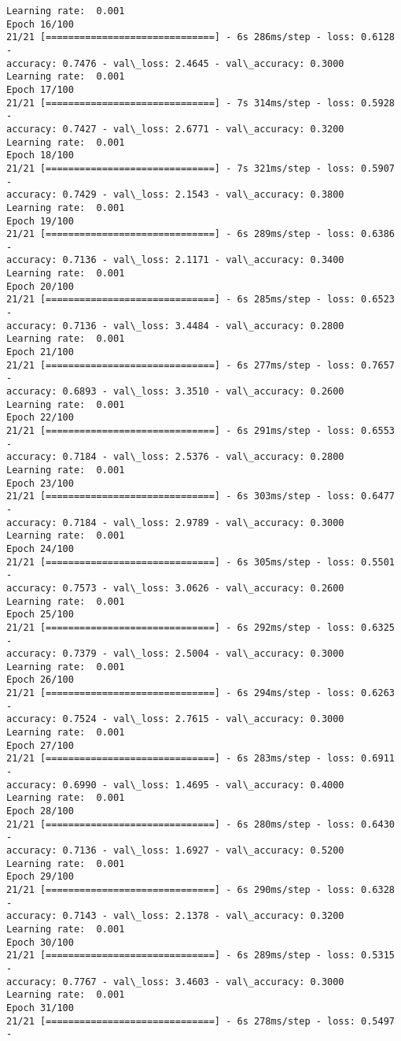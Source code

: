 \documentclass[11pt]{article}
\begin{document}
\begin{Verbatim}[commandchars=\\\{\}]
Learning rate:  0.001
Epoch 16/100
21/21 [==============================] - 6s 286ms/step - loss: 0.6128 -
accuracy: 0.7476 - val\_loss: 2.4645 - val\_accuracy: 0.3000
Learning rate:  0.001
Epoch 17/100
21/21 [==============================] - 7s 314ms/step - loss: 0.5928 -
accuracy: 0.7427 - val\_loss: 2.6771 - val\_accuracy: 0.3200
Learning rate:  0.001
Epoch 18/100
21/21 [==============================] - 7s 321ms/step - loss: 0.5907 -
accuracy: 0.7429 - val\_loss: 2.1543 - val\_accuracy: 0.3800
Learning rate:  0.001
Epoch 19/100
21/21 [==============================] - 6s 289ms/step - loss: 0.6386 -
accuracy: 0.7136 - val\_loss: 2.1171 - val\_accuracy: 0.3400
Learning rate:  0.001
Epoch 20/100
21/21 [==============================] - 6s 285ms/step - loss: 0.6523 -
accuracy: 0.7136 - val\_loss: 3.4484 - val\_accuracy: 0.2800
Learning rate:  0.001
Epoch 21/100
21/21 [==============================] - 6s 277ms/step - loss: 0.7657 -
accuracy: 0.6893 - val\_loss: 3.3510 - val\_accuracy: 0.2600
Learning rate:  0.001
Epoch 22/100
21/21 [==============================] - 6s 291ms/step - loss: 0.6553 -
accuracy: 0.7184 - val\_loss: 2.5376 - val\_accuracy: 0.2800
Learning rate:  0.001
Epoch 23/100
21/21 [==============================] - 6s 303ms/step - loss: 0.6477 -
accuracy: 0.7184 - val\_loss: 2.9789 - val\_accuracy: 0.3000
Learning rate:  0.001
Epoch 24/100
21/21 [==============================] - 6s 305ms/step - loss: 0.5501 -
accuracy: 0.7573 - val\_loss: 3.0626 - val\_accuracy: 0.2600
Learning rate:  0.001
Epoch 25/100
21/21 [==============================] - 6s 292ms/step - loss: 0.6325 -
accuracy: 0.7379 - val\_loss: 2.5004 - val\_accuracy: 0.3000
Learning rate:  0.001
Epoch 26/100
21/21 [==============================] - 6s 294ms/step - loss: 0.6263 -
accuracy: 0.7524 - val\_loss: 2.7615 - val\_accuracy: 0.3000
Learning rate:  0.001
Epoch 27/100
21/21 [==============================] - 6s 283ms/step - loss: 0.6911 -
accuracy: 0.6990 - val\_loss: 1.4695 - val\_accuracy: 0.4000
Learning rate:  0.001
Epoch 28/100
21/21 [==============================] - 6s 280ms/step - loss: 0.6430 -
accuracy: 0.7136 - val\_loss: 1.6927 - val\_accuracy: 0.5200
Learning rate:  0.001
Epoch 29/100
21/21 [==============================] - 6s 290ms/step - loss: 0.6328 -
accuracy: 0.7143 - val\_loss: 2.1378 - val\_accuracy: 0.3200
Learning rate:  0.001
Epoch 30/100
21/21 [==============================] - 6s 289ms/step - loss: 0.5315 -
accuracy: 0.7767 - val\_loss: 3.4603 - val\_accuracy: 0.3000
Learning rate:  0.001
Epoch 31/100
21/21 [==============================] - 6s 278ms/step - loss: 0.5497 -

\end{Verbatim}
\end{document}
